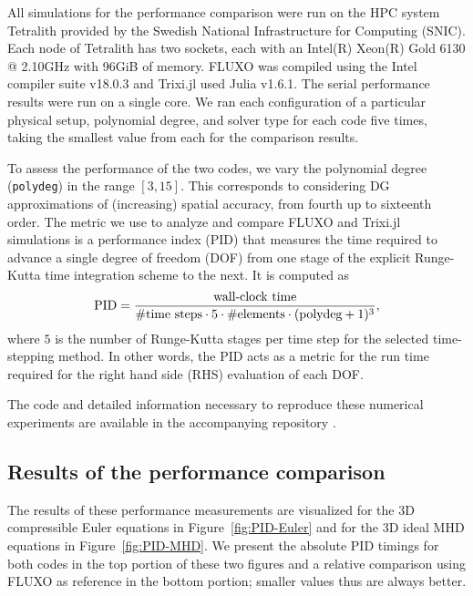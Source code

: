 \documentclass[hidelinks]{juliacon} %
\newcommand{\trixi}{Trixi.jl\xspace}
\begin{document}
All simulations for the performance comparison were run on the HPC system Tetralith
provided by the Swedish National Infrastructure for Computing (SNIC).
Each node of Tetralith has two sockets, each with an Intel(R) Xeon(R) Gold 6130 @ 2.10GHz with 96GiB of memory.
FLUXO was compiled using the Intel compiler suite v18.0.3 and \trixi used Julia v1.6.1.
The serial performance results were run on a single core.
We ran each configuration of a particular physical setup, polynomial degree, and solver type
for each code five times, taking the smallest value from each for the comparison results.

To assess the performance of the two codes, we vary the polynomial degree
(\lstinline{polydeg}) in the range $[3,15]$.
This corresponds to considering DG approximations of (increasing) spatial accuracy, from fourth up to sixteenth order.
The metric we use to analyze and compare FLUXO and \trixi simulations is a performance index (PID) that
measures the time required to advance a single degree of freedom (DOF) from one stage of the explicit Runge-Kutta
time integration scheme to the next. It is computed as
\begin{equation}
\label{eqn:pid}
\text{PID} = \frac{\text{wall-clock time}}{\#\text{time steps}\cdot 5\cdot\#\text{elements}\cdot(\text{\lstinline{polydeg}}+1)^3},
\end{equation}
where $5$ is the number of Runge-Kutta stages per time step for the selected time-stepping method. In other words, the PID acts
as a metric for the run time required for the right hand side (RHS) evaluation of each DOF.

The code and detailed information necessary to reproduce these numerical
experiments are available in the accompanying repository \cite{ranocha2021adaptiveRepro}.

\subsection{Results of the performance comparison}

The results of these performance measurements are visualized for the 3D compressible Euler equations
in Figure~\ref{fig:PID-Euler} and for the 3D ideal MHD equations in Figure~\ref{fig:PID-MHD}.
We present the absolute PID timings for both codes in the top portion of these two figures and
a relative comparison using FLUXO as reference in the bottom portion; smaller values thus are always
better.
\end{document}
